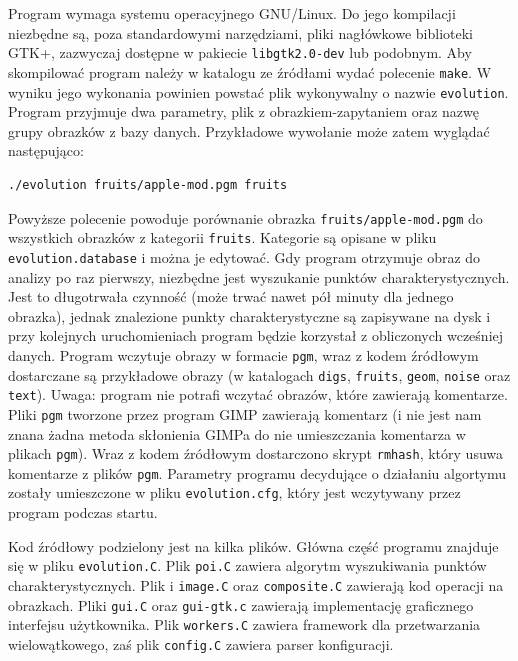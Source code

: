\documentclass[a4paper,12pt,leqno]{article}
\begin{document}
Program wymaga systemu operacyjnego GNU/Linux. Do jego kompilacji niezbędne są, poza standardowymi narzędziami, pliki nagłówkowe biblioteki GTK+,
zazwyczaj dostępne w pakiecie \texttt{libgtk2.0-dev} lub podobnym. Aby skompilować program należy w katalogu ze źródłami wydać polecenie \texttt{make}.
W wyniku jego wykonania powinien powstać plik wykonywalny o nazwie \texttt{evolution}. Program przyjmuje dwa parametry, plik z obrazkiem-zapytaniem oraz
nazwę grupy obrazków z bazy danych. Przykładowe wywołanie może zatem wyglądać następująco:
\begin{verbatim}./evolution fruits/apple-mod.pgm fruits\end{verbatim}
Powyższe polecenie powoduje porównanie obrazka \texttt{fruits/apple-mod.pgm} do wszystkich obrazków z kategorii \texttt{fruits}.
Kategorie są opisane w pliku \texttt{evolution.database} i można je edytować. Gdy program otrzymuje obraz do analizy po raz pierwszy, niezbędne jest
wyszukanie punktów charakterystycznych. Jest to długotrwała czynność (może trwać nawet pół minuty dla jednego obrazka), jednak znalezione punkty
charakterystyczne są zapisywane na dysk i przy kolejnych uruchomieniach program będzie korzystał z obliczonych wcześniej danych. Program wczytuje
obrazy w formacie \texttt{pgm}, wraz z kodem źródłowym dostarczane są przykładowe obrazy (w katalogach \texttt{digs}, \texttt{fruits}, \texttt{geom},
\texttt{noise} oraz \texttt{text}). Uwaga: program nie potrafi wczytać obrazów, które zawierają komentarze. Pliki \texttt{pgm} tworzone przez program
GIMP zawierają komentarz (i nie jest nam znana żadna metoda skłonienia GIMPa do nie umieszczania komentarza w plikach \texttt{pgm}). Wraz z kodem
źródłowym dostarczono skrypt \texttt{rmhash}, który usuwa komentarze z plików \texttt{pgm}. Parametry programu decydujące o działaniu algortymu
zostały umieszczone w pliku \texttt{evolution.cfg}, który jest wczytywany przez program podczas startu.

Kod źródłowy podzielony jest na kilka plików. Główna część programu znajduje się w pliku \texttt{evolution.C}. Plik \texttt{poi.C} zawiera algorytm
wyszukiwania punktów charakterystycznych. Plik i \texttt{image.C} oraz \texttt{composite.C} zawierają kod operacji na obrazkach. Pliki \texttt{gui.C}
oraz \texttt{gui-gtk.c} zawierają implementację graficznego interfejsu użytkownika. Plik \texttt{workers.C} zawiera framework dla przetwarzania
wielowątkowego, zaś plik \texttt{config.C} zawiera parser konfiguracji.
\end{document}
